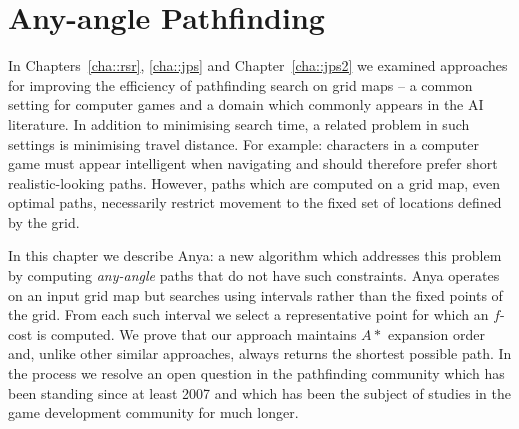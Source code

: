 \chapter{Any-angle Pathfinding}
\label{cha::anya}
In Chapters~\ref{cha::rsr}, \ref{cha::jps} and Chapter~\ref{cha::jps2}
we examined approaches for
improving the efficiency of pathfinding search on grid maps -- a common
setting for computer games and a domain which commonly appears in the AI
literature. 
In addition to minimising search time, a related problem in such settings
is minimising travel distance. For example: characters in a computer game 
must appear intelligent when navigating and should therefore prefer short
realistic-looking paths. However, paths which are computed on a grid map, 
even optimal paths, necessarily restrict movement to the fixed set of 
locations defined by the grid. 
\par
In this chapter we describe Anya: a new algorithm which addresses this
problem by computing \emph{any-angle} paths that do not have such constraints.
Anya operates on an input grid map but searches using intervals rather than 
the fixed points of the grid. 
From each such interval we select a representative point for which an
$f$-cost is computed. 
We prove that our approach maintains $A*$ expansion order and, unlike other
similar approaches, always returns the shortest possible path.
In the process we resolve an open question in the pathfinding community which
has been standing since at least 2007 and which has been the subject of
studies in the game development community for much longer.

\newpage

